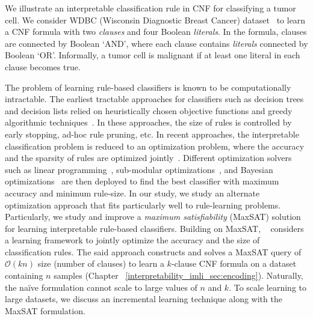 \begin{example}
	We illustrate an interpretable classification rule in CNF for classifying a tumor cell. We consider WDBC (Wisconsin Diagnostic Breast Cancer) dataset~\cite{agarap2018breast} to learn a CNF formula with two \emph{clauses} and four Boolean \emph{literals}. In the formula, clauses are connected by Boolean `AND', where each clause contains \emph{literals} connected by Boolean `OR'. Informally, a tumor cell is malignant if at least one literal in each clause becomes true.
\end{example}



The problem of learning rule-based classifiers is known to be computationally intractable. The earliest tractable approaches for classifiers such as decision trees and decision lists relied on heuristically chosen objective functions and greedy algorithmic techniques~\cite{ClarkN1989,CohenS1999,quinlan2014}. In these approaches, the size of rules is controlled by early stopping,  ad-hoc rule pruning, etc. In recent approaches, the interpretable classification problem is reduced to an optimization problem, where the accuracy and the sparsity of rules are optimized jointly~\cite{lakkaraju2016interpretable,narodytska2018learning}. Different optimization solvers such as linear programming~\cite{malioutov2013exact}, sub-modular optimizations~\cite{lakkaraju2016interpretable}, and Bayesian optimizations~\cite{letham2015interpretable} are then deployed to find the best classifier with maximum accuracy and minimum rule-size. In our study, we study an alternate optimization approach that fits particularly well to rule-learning problems. Particularly,  we study and improve a \textit{maximum satisfiability} (MaxSAT)  solution for learning interpretable rule-based classifiers. Building on MaxSAT, ~\cite{malioutov2018mlic} considers a learning framework to jointly optimize the accuracy and the size of classification rules. The said approach constructs and solves a MaxSAT query of $ \mathcal{O}(kn) $  size (number of clauses) to learn a $ k $-clause CNF formula on a dataset containing $ n $ samples (Chapter ~\ref{interpretability_imli_sec:encoding}). Naturally, the na\"ive formulation cannot scale to large values of $ n $ and $ k $. To scale learning to large datasets, we discuss an incremental learning technique along with the MaxSAT formulation.





